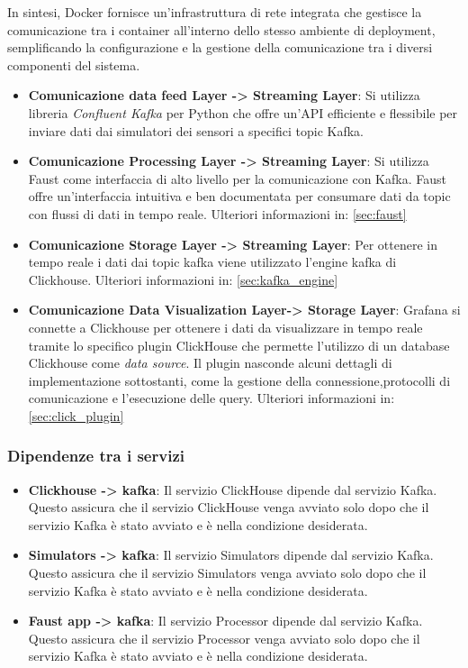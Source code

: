 In sintesi, Docker fornisce un'infrastruttura di rete integrata che gestisce la comunicazione tra i container all'interno dello stesso ambiente di deployment, semplificando la configurazione e la gestione della comunicazione tra i diversi componenti del sistema.
\begin{itemize}
    \item \textbf{Comunicazione data feed Layer -> Streaming Layer}: Si utilizza libreria \textit{Confluent Kafka} per Python che offre un'API efficiente e flessibile per inviare dati dai simulatori dei sensori a specifici topic Kafka.
    \item \textbf{Comunicazione Processing Layer -> Streaming Layer}: Si utilizza Faust come interfaccia di alto livello per la comunicazione con Kafka. Faust offre un'interfaccia intuitiva e ben documentata per consumare dati da topic con flussi di dati in tempo reale.
    Ulteriori informazioni in: \ref{sec:faust}
    \item \textbf{Comunicazione Storage Layer -> Streaming Layer}: Per ottenere in tempo reale i dati dai topic kafka viene utilizzato l'engine kafka di Clickhouse. Ulteriori informazioni in: \ref{sec:kafka_engine}
    \item \textbf{Comunicazione Data Visualization Layer-> Storage Layer}: Grafana si connette a Clickhouse per ottenere i dati da visualizzare in tempo reale tramite lo specifico plugin ClickHouse che permette l'utilizzo di un database Clickhouse come \textit{data source}.
    Il plugin nasconde alcuni dettagli di implementazione sottostanti, come la gestione della connessione,protocolli di comunicazione e l'esecuzione delle query. Ulteriori informazioni in: \ref{sec:click_plugin}
\end{itemize}
    
\subsubsection{Dipendenze tra i servizi}
\begin{itemize}
    \item \textbf{Clickhouse -> kafka}: Il servizio ClickHouse dipende dal servizio Kafka. Questo assicura che il servizio ClickHouse venga avviato solo dopo che il servizio Kafka è stato avviato e è nella condizione desiderata.

    \item \textbf{Simulators -> kafka}: Il servizio Simulators dipende dal servizio Kafka. Questo assicura che il servizio Simulators venga avviato solo dopo che il servizio Kafka è stato avviato e è nella condizione desiderata.
    
    \item \textbf{ Faust app -> kafka}: Il servizio Processor dipende dal servizio Kafka. Questo assicura che il servizio Processor venga avviato solo dopo che il servizio Kafka è stato avviato e è nella condizione desiderata.
\end{itemize}

